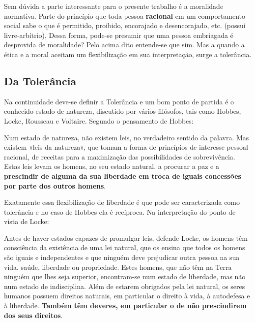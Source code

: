 \documentclass[
	12pt,				%
	openright,			%
	twoside,			%
	a4paper,			%
	chapter=TITLE,		%
	section=TITLE,		%
	subsection=TITLE,	%
	subsubsection=TITLE,%
	spanish,            %
	english,			%
	brazil				%
	]{abntex2}
\begin{document}
\par
Sem dúvida a parte interessante para o presente trabalho é a moralidade normativa. Parte do princípio que toda pessoa \textbf{racional}
em um comportamento social sabe o que é permitido, proibido, encorajado e desencorajado, etc. (possui livre-arbítrio), Dessa forma, pode-se presumir que uma pessoa embriagada é desprovida de moralidade? Pelo acima dito entende-se que sim. Mas a quando a ética e a moral aceitam um flexibilização em sua interpretação, surge a tolerância.

\subsection{Da Tolerância}

Na continuidade deve-se definir a Tolerância e um bom ponto de partida é o conhecido estado de natureza, discutido por vários filósofos, tais como Hobbes, Locke, Rousseau e Voltaire. Segundo o pensamento de Hobbes:
\begin{citacao}
	Num estado de natureza, não existem leis, no verdadeiro sentido da
	palavra. Mas existem «leis da natureza», que tomam a forma de princípios de interesse pessoal racional, de receitas para a maximização
	das possibilidades de sobrevivência. Estas leis levam os homens, no
	seu estado natural, a procurar a paz e a \textbf{prescindir de alguma da sua
	liberdade em troca de iguais concessões por parte dos outros homens}.\cite[p. ~291, grifo do autor]{Kenny}
\end{citacao}
\par
Exatamente essa flexibilização de liberdade é que pode ser caracterizada como tolerância e no caso de Hobbes ela é recíproca. Na interpretação do ponto de vista de Locke:
\begin{citacao}
	Antes de haver estados capazes de promulgar leis, defende Locke,
	os homens têm consciência da existência de uma lei natural, que os
	ensina que todos os homens são iguais e independentes e que ninguém
	deve prejudicar outra pessoa na sua vida, saúde, liberdade ou propriedade. Estes homens, que não têm na Terra ninguém que lhes seja
	superior, encontram-se num estado de liberdade, mas não num estado
	de indisciplina. Além de estarem obrigados pela lei natural, os seres
	humanos possuem direitos naturais, em particular o direito à vida, à
	autodefesa e à liberdade. \textbf{Também têm deveres, em particular o de não
	prescindirem dos seus direitos}.\cite[p. ~293, grifo do autor]{Kenny}
\end{citacao}
\end{document}
